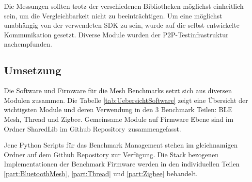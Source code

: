 Die Messungen sollten trotz der verschiedenen Bibliotheken möglichst einheitlich sein, um die Vergleichbarkeit nicht zu beeinträchtigen. Um eine möglichst unabhängig von der verwendeten SDK zu sein, wurde auf die selbst entwickelte Kommunikation gesetzt. Diverse Module wurden der P2P-Testinfrastruktur nachempfunden. 


\subsection{Umsetzung}\label{subsec:Software_Umsetzung}


Die Software und Firmware für die Mesh Benchmarks setzt sich aus diversen Modulen zusammen. Die Tabelle \ref{tab:UebersichtSoftware} zeigt eine Übersicht der wichtigsten Module und deren Verwendung in den 3 Benchmark Teilen: BLE Mesh, Thread und Zigbee.
Gemeinsame Module auf Firmware Ebene sind im Ordner SharedLib im Github Repository\footnotemark\ zusammengefasst.

Jene Python Scripts für das Benchmark Management stehen im gleichnamigen Ordner auf dem Github Repository zur Verfügung.
Die Stack bezogenen Implementationen der Benchmark Firmware werden in den individuellen Teilen \ref{part:BluetoothMesh}, \ref{part:Thread} und \ref{part:Zigbee} behandelt.



